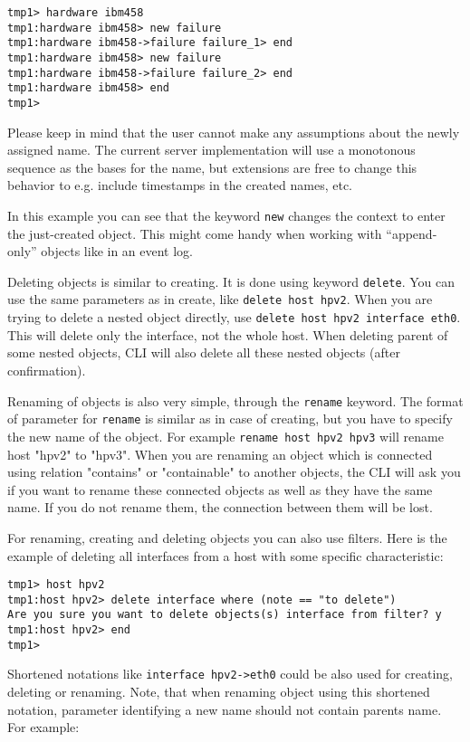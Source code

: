 \documentclass[deska]{subfiles}
\begin{document}
\begin{verbatim}
tmp1> hardware ibm458
tmp1:hardware ibm458> new failure
tmp1:hardware ibm458->failure failure_1> end
tmp1:hardware ibm458> new failure
tmp1:hardware ibm458->failure failure_2> end
tmp1:hardware ibm458> end
tmp1>
\end{verbatim}

Please keep in mind that the user cannot make any assumptions about the newly assigned name.  The current server
implementation will use a monotonous sequence as the bases for the name, but extensions are free to change this behavior
to e.g. include timestamps in the created names, etc.

In this example you can see that the keyword {\tt new} changes the context to enter the just-created object.  This might
come handy when working with ``append-only'' objects like in an event log.

Deleting objects is similar to creating. It is done using keyword {\tt delete}. You can use the same parameters as in
create, like {\tt delete host hpv2}. When you are trying to delete a nested object directly, use {\tt delete host hpv2 interface
eth0}. This will delete only the interface, not the whole host. When deleting parent of some nested objects, CLI will
also delete all these nested objects (after confirmation).

Renaming of objects is also very simple, through the {\tt rename} keyword. The format of
parameter for {\tt rename} is similar as in case of creating, but you have to specify the new name of the object. For example
{\tt rename host hpv2 hpv3} will rename host "hpv2" to "hpv3". When you are renaming an object which is connected using relation
"contains" or "containable" to another objects, the CLI will ask you if you want to rename these connected objects
as well as they have the same name. If you do not rename them, the connection between them will be lost.

For renaming, creating and deleting objects you can also use filters. Here is the example of deleting all interfaces from
a host with some specific characteristic:

\begin{verbatim}
tmp1> host hpv2
tmp1:host hpv2> delete interface where (note == "to delete")
Are you sure you want to delete objects(s) interface from filter? y
tmp1:host hpv2> end
tmp1>
\end{verbatim}

Shortened notations like {\tt interface hpv2->eth0} could be also used for creating, deleting or renaming. Note, that when renaming
object using this shortened notation, parameter identifying a new name should not contain parents name. For example:
\end{document}
